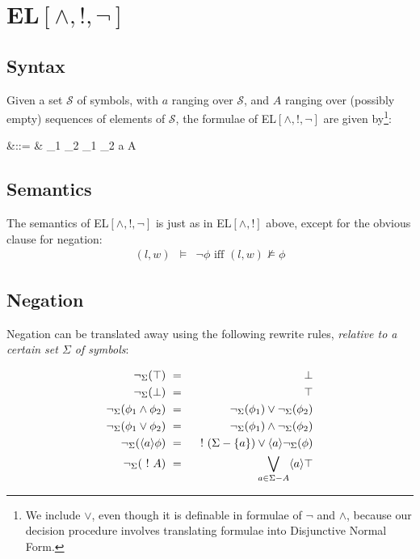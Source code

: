\section{EL$[\land, !, \neg]$}


\subsection{Syntax}

Given a set $\mathcal{S}$ of symbols, with $a$ ranging over
$\mathcal{S}$, and $A$ ranging over (possibly empty) sequences of
elements of $\mathcal{S}$, the formulae of EL$[\land, !, \neg]$ are
given by\footnote{We include $\lor$, even though it is definable in
formulae of $\neg$ and $\land$, because our decision procedure involves
translating formulae into Disjunctive Normal Form.}:

\begin{GRAMMAR}
  \phi 
     &\quad ::= \quad & 
   \top \fOr \bot \fOr \neg \phi \fOr \phi_1 \land \phi_2 \fOr\phi_1 \lor \phi_2 \fOr \langle a \rangle \phi \fOr \fBang A 
\end{GRAMMAR}

\subsection{Semantics}

The semantics of EL$[\land, !, \neg]$ is just as in EL$[\land, !]$
above, except for the obvious clause for negation:
\begin{eqnarray}
(l,w) & \models & \neg \phi \mbox{ iff } (l,w) \nvDash \phi \nonumber
\end{eqnarray}

\subsection{Negation}

Negation can be translated away using the following rewrite rules,
\emph{relative to a certain set $\Sigma$ of symbols}:

\begin{eqnarray}
  \neg_{\Sigma}(\top) & \ = \ & \bot \nonumber \\
  \neg_\Sigma(\bot) & \ = \ & \top \nonumber \\
  \neg_\Sigma(\phi_1 \land \phi_2) & \ = \ & \neg_\Sigma(\phi_1) \lor \neg_\Sigma(\phi_2) \nonumber \\
  \neg_\Sigma(\phi_1 \lor \phi_2) & \ = \ & \neg_\Sigma(\phi_1) \land \neg_\Sigma(\phi_2) \nonumber \\
  \neg_\Sigma(\langle a \rangle \phi) & \ = \ & \ ! \ (\Sigma-\{a\}) \lor \langle a \rangle \neg_\Sigma(\phi) \nonumber \\
  \neg_\Sigma(\ ! \  A) & \ = \ & \bigvee_{a \in \Sigma - A} \langle a \rangle \top\nonumber
\end{eqnarray}

